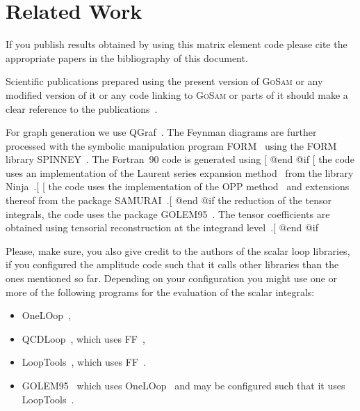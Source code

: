 {{{{{{{{{\printindex

\section{Related Work}
If you publish results obtained by using this matrix element code
please cite the appropriate papers in the bibliography of this document.

Scientific publications prepared using the present version of
\textsc{GoSam} or any modified version of it or any code linking to
\textsc{GoSam} or parts of it should make a clear
reference to the publications~\cite{Cullen:2014yla,Cullen:2011ac}.

For graph generation we use QGraf~\cite{Nogueira:1991ex}.
The Feynman diagrams are further processed with the symbolic manipulation
program FORM~\cite{Kuipers:2012rf,Vermaseren:2000nd} using the FORM library
SPINNEY~\cite{Cullen:2010jv}.
The Fortran~90 code is generated using 
[%
@end @if %
[%
the code uses an implementation of the Laurent series expansion 
method~\cite{Mastrolia:2012bu}
from the library Ninja~\cite{Peraro:2014cba}.[%
[%
the code uses the implementation of the OPP
method~\cite{Ossola:2006us,Ossola:2007bb}
and extensions thereof from the package
SAMURAI~\cite{Mastrolia:2010nb}.[%
@end @if %
the reduction of the tensor integrals, the code uses the 
package GOLEM95~\cite{Guillet:2013msa,Binoth:2008uq,Cullen:2011kv}.
The tensor coefficients are
obtained using tensorial reconstruction at the integrand
level~\cite{Heinrich:2010ax}.[%
@end @if %

Please, make sure, you also give credit to the authors of the scalar
loop libraries, if you configured the amplitude code such that it calls
other libraries than the ones mentioned so far. Depending on your
configuration you might use one or more of the following programs for
the evaluation of the scalar integrals:
\begin{itemize}
\item OneLOop~\cite{vanHameren:2010cp},
\item QCDLoop~\cite{Ellis:2007qk}, which uses FF~\cite{vanOldenborgh:1990yc},
\item LoopTools~\cite{Hahn:1998yk}, which uses FF~\cite{vanOldenborgh:1990yc}.
\item GOLEM95~\cite{Binoth:2008uq,Guillet:2013msa} which uses OneLOop~\cite{vanHameren:2010cp}
   and may be configured such that it uses
   LoopTools~\cite{Hahn:1998yk,vanOldenborgh:1990yc}.
\end{itemize}

}}}}}}}}}
